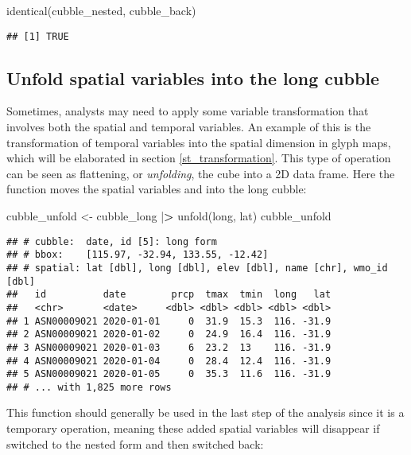 \documentclass{article}
\newenvironment{Shaded}{\begin{snugshade}}{\end{snugshade}}
\newcommand{\ErrorTok}[1]{\textcolor[rgb]{0.64,0.00,0.00}{\textbf{#1}}}
\newcommand{\FunctionTok}[1]{\textcolor[rgb]{0.00,0.00,0.00}{#1}}
\newcommand{\NormalTok}[1]{#1}
\newcommand{\OtherTok}[1]{\textcolor[rgb]{0.56,0.35,0.01}{#1}}
\newcommand{\SpecialCharTok}[1]{\textcolor[rgb]{0.00,0.00,0.00}{#1}}
\begin{document}
\begin{Shaded}
\begin{Highlighting}[]
\FunctionTok{identical}\NormalTok{(cubble\_nested, cubble\_back)}
\end{Highlighting}
\end{Shaded}

\begin{verbatim}
## [1] TRUE
\end{verbatim}

\hypertarget{unfold}{%
\subsection{Unfold spatial variables into the long cubble}\label{unfold}}

Sometimes, analysts may need to apply some variable transformation that involves both the spatial and temporal variables. An example of this is the transformation of temporal variables into the spatial dimension in glyph maps, which will be elaborated in section \ref{st_transformation}. This type of operation can be seen as flattening, or \emph{unfolding}, the cube into a 2D data frame. Here the function  moves the spatial variables  and  into the long cubble:

\begin{Shaded}
\begin{Highlighting}[]
\NormalTok{cubble\_unfold }\OtherTok{\textless{}{-}}\NormalTok{ cubble\_long }\SpecialCharTok{|}\ErrorTok{\textgreater{}} \FunctionTok{unfold}\NormalTok{(long, lat)}
\NormalTok{cubble\_unfold}
\end{Highlighting}
\end{Shaded}

\begin{verbatim}
## # cubble:  date, id [5]: long form
## # bbox:    [115.97, -32.94, 133.55, -12.42]
## # spatial: lat [dbl], long [dbl], elev [dbl], name [chr], wmo_id [dbl]
##   id          date        prcp  tmax  tmin  long   lat
##   <chr>       <date>     <dbl> <dbl> <dbl> <dbl> <dbl>
## 1 ASN00009021 2020-01-01     0  31.9  15.3  116. -31.9
## 2 ASN00009021 2020-01-02     0  24.9  16.4  116. -31.9
## 3 ASN00009021 2020-01-03     6  23.2  13    116. -31.9
## 4 ASN00009021 2020-01-04     0  28.4  12.4  116. -31.9
## 5 ASN00009021 2020-01-05     0  35.3  11.6  116. -31.9
## # ... with 1,825 more rows
\end{verbatim}

This function should generally be used in the last step of the analysis since it is a temporary operation, meaning these added spatial variables will disappear if switched to the nested form and then switched back:
\end{document}
